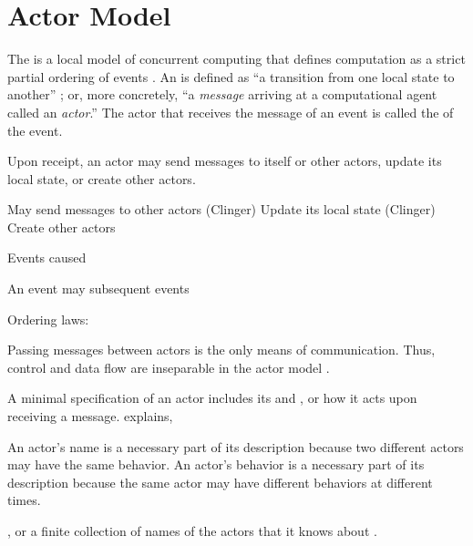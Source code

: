 \chapter{Actor Model}\label{ch:actor-model}

\newcommand{\vEvents}{\vSet{E}}
\newcommand{\vEvent}{e}

The  is a local model of concurrent computing that defines computation as a strict partial ordering of events \citep{Hewitt1977a, Hewitt1977b}. An  is defined as ``a transition from one local state to another'' \citep{Hewitt1977b}; or, more concretely, ``a \textit{message} arriving at a computational agent called an \textit{actor}.'' The actor that receives the message of an event is called the  of the event.

Upon receipt, an actor may send messages to itself or other actors, update its local state, or create other actors.

May send messages to other actors (Clinger)
Update its local state (Clinger)
Create other actors

Events caused 

An event may  subsequent events


Ordering laws:


\clearpage

Passing messages between actors is the only means of communication. Thus, control and data flow are inseparable in the actor model \citep{Hewitt1973}.

A minimal specification of an actor includes its  and , or how it acts upon receiving a message. \citet{Clinger1981} explains,
%
\begin{displayquote}
  An actor's name is a necessary part of its description because two different actors may have the same behavior. An actor's behavior is a necessary part of its description because the same actor may have different behaviors at different times.
\end{displayquote}
%
, or a finite collection of names of the actors that it knows about \citep{Hewitt1973}.


